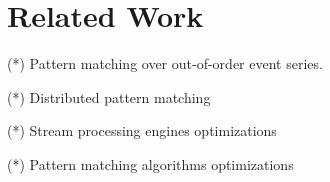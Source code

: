 \section{Related Work}
\label{sec:rel_work}

(*) Pattern matching over out-of-order event series.

(*) Distributed pattern matching

(*) Stream processing engines optimizations

(*) Pattern matching algorithms optimizations